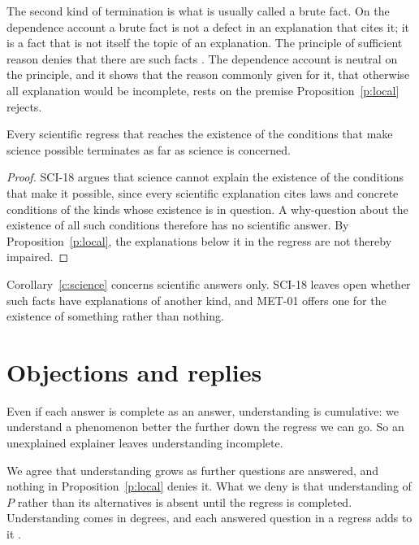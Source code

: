 \documentclass{situationist-preprint}
\begin{document}
The second kind of termination is what is usually called a brute fact. On the dependence account a brute fact is not a defect in an explanation that cites it; it is a fact that is not itself the topic of an explanation. The principle of sufficient reason denies that there are such facts \citep{Pruss2006}. The dependence account is neutral on the principle, and it shows that the reason commonly given for it, that otherwise all explanation would be incomplete, rests on the premise Proposition~\ref{p:local} rejects.

\begin{corollary}\label{c:science}
Every scientific regress that reaches the existence of the conditions that make science possible terminates as far as science is concerned.
\end{corollary}

\begin{proof}
SCI-18 argues that science cannot explain the existence of the conditions that make it possible, since every scientific explanation cites laws and concrete conditions of the kinds whose existence is in question. A why-question about the existence of all such conditions therefore has no scientific answer. By Proposition~\ref{p:local}, the explanations below it in the regress are not thereby impaired.
\end{proof}

Corollary~\ref{c:science} concerns scientific answers only. SCI-18 leaves open whether such facts have explanations of another kind, and MET-01 offers one for the existence of something rather than nothing.

\section{Objections and replies}\label{s:objections}

\begin{objection}[Understanding]
Even if each answer is complete as an answer, understanding is cumulative: we understand a phenomenon better the further down the regress we can go. So an unexplained explainer leaves understanding incomplete.
\end{objection}

\begin{reply}
We agree that understanding grows as further questions are answered, and nothing in Proposition~\ref{p:local} denies it. What we deny is that understanding of $P$ rather than its alternatives is absent until the regress is completed. Understanding comes in degrees, and each answered question in a regress adds to it \citep{Garfinkel1981}.
\end{reply}
\end{document}
